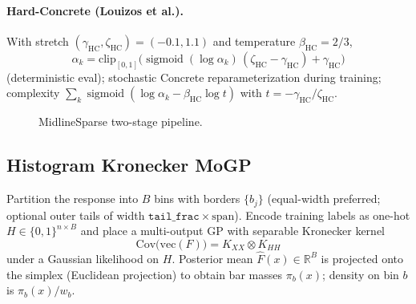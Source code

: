 \documentclass[11pt,a4paper]{article}
\theoremstyle{definition}
\newcommand{\R}{\mathbb{R}}
\newcommand{\D}{\mathcal{D}}
\newcommand{\sigmoid}{\operatorname{sigmoid}}
\begin{document}
\paragraph{Hard-Concrete (Louizos et al.).}
With stretch $(\gamma_{\mathrm{HC}},\zeta_{\mathrm{HC}})=(-0.1,1.1)$ and
temperature $\beta_{\mathrm{HC}}=2/3$,
\begin{equation}
  \alpha_k
  =
  \mathrm{clip}_{[0,1]}
  \bigl(
    \sigmoid(\log\alpha_k)\,(\zeta_{\mathrm{HC}}-\gamma_{\mathrm{HC}})
    +\gamma_{\mathrm{HC}}
  \bigr)
\end{equation}
(deterministic eval); stochastic Concrete reparameterization during training;
complexity $\sum_k \sigmoid(\log\alpha_k-\beta_{\mathrm{HC}}\log t)$ with
$t=-\gamma_{\mathrm{HC}}/\zeta_{\mathrm{HC}}$.

\begin{figure}[ht]
\centering
{}
\caption{MidlineSparse two-stage pipeline.}
\label{fig:gamma-pipe}
\end{figure}

\subsection{Histogram Kronecker MoGP}
\label{sec:hist}

Partition the response into $B$ bins with borders $\{b_j\}$ (equal-width preferred;
optional outer tails of width $\texttt{tail\_frac}\times\mathrm{span}$).
Encode training labels as one-hot $H\in\{0,1\}^{n\times B}$ and place a
multi-output GP with separable Kronecker kernel
\begin{equation}
  \mathrm{Cov}\bigl(\mathrm{vec}(F)\bigr)
  =
  K_{XX}\otimes K_{HH}
\end{equation}
under a Gaussian likelihood on $H$. Posterior mean $\widehat F(x)\in\R^B$ is
projected onto the simplex (Euclidean projection) to obtain bar masses
$\pi_b(x)$; density on bin $b$ is $\pi_b(x)/w_b$.
\end{document}
